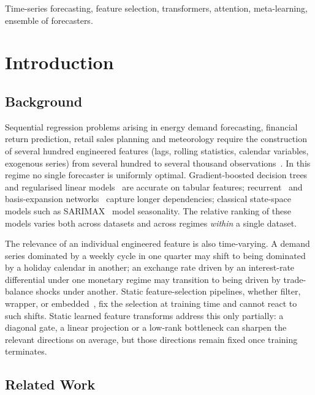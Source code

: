 \documentclass[journal]{IEEEtran}
\begin{document}
\begin{IEEEkeywords}
Time-series forecasting, feature selection, transformers, attention, meta-learning, ensemble of forecasters.
\end{IEEEkeywords}

\section{Introduction}

\subsection{Background}

Sequential regression problems arising in energy demand forecasting, financial return prediction, retail sales planning and meteorology require the construction of several hundred engineered features (lags, rolling statistics, calendar variables, exogenous series) from several hundred to several thousand observations~\cite{box2015tsbook,makridakis2020m4,makridakis2022m5}. In this regime no single forecaster is uniformly optimal. Gradient-boosted decision trees~\cite{ke2017lightgbm,chen2016xgboost,prokhorenkova2018catboost} and regularised linear models~\cite{tibshirani1996lasso} are accurate on tabular features; recurrent~\cite{hochreiter1997lstm,salinas2020deepar} and basis-expansion networks~\cite{oreshkin2020nbeats} capture longer dependencies; classical state-space models such as SARIMAX~\cite{box2015tsbook} model seasonality. The relative ranking of these models varies both across datasets and across regimes \emph{within} a single dataset.

The relevance of an individual engineered feature is also time-varying. A demand series dominated by a weekly cycle in one quarter may shift to being dominated by a holiday calendar in another; an exchange rate driven by an interest-rate differential under one monetary regime may transition to being driven by trade-balance shocks under another. Static feature-selection pipelines, whether filter, wrapper, or embedded~\cite{guyon2003introfs,kononenko1994relieff}, fix the selection at training time and cannot react to such shifts. Static learned feature transforms address this only partially: a diagonal gate, a linear projection or a low-rank bottleneck can sharpen the relevant directions on average, but those directions remain fixed once training terminates.

\subsection{Related Work}
\end{document}
